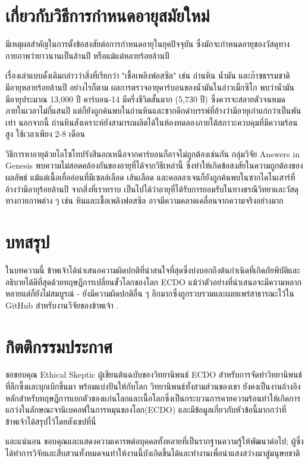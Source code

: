\documentclass[10pt,twocolumn,letterpaper]{article}
\begin{document}
\section{เกี่ยวกับวิธีการกำหนดอายุสมัยใหม่}

มีเหตุผลสำคัญในการตั้งข้อสงสัยต่อการกำหนดอายุในยุคปัจจุบัน ซึ่งมักจะกำหนดอายุของวัสดุทางกายภาพว่ายาวนานเป็นล้านปี หรือแม้แต่หลายร้อยล้านปี

เรื่องเล่าแบบดั้งเดิมกล่าวว่าสิ่งที่เรียกว่า "เชื้อเพลิงฟอสซิล" เช่น ถ่านหิน น้ำมัน และก๊าซธรรมชาติ มีอายุหลายร้อยล้านปี \cite{104} อย่างไรก็ตาม ผลการตรวจอายุคาร์บอนของน้ำมันในอ่าวเม็กซิโก พบว่าน้ำมันมีอายุประมาณ 13,000 ปี \cite{105} คาร์บอน-14 มีครึ่งชีวิตสั้นมาก (5,730 ปี) ซึ่งควรจะสลายตัวจนหมดภายในเวลาไม่กี่แสนปี แต่ก็ยังถูกค้นพบในถ่านหินและซากดึกดำบรรพ์ที่อ้างว่ามีอายุเก่าแก่กว่าเป็นพันเท่า \cite{106} นอกจากนี้ ถ่านหินสังเคราะห์ยังสามารถผลิตได้ในห้องทดลองภายใต้สภาวะควบคุมที่มีความร้อนสูง ใช้เวลาเพียง 2-8 เดือน \cite{107}

วิธีการหาอายุด้วยไอโซโทปรังสีนอกเหนือจากคาร์บอนก็อาจไม่ถูกต้องเช่นกัน กลุ่มวิจัย Answers in Genesis พบความไม่สอดคล้องกันของอายุที่ได้จากวิธีเหล่านี้ ซึ่งทำให้เกิดข้อสงสัยในความถูกต้องของผลลัพธ์ \cite{108} แม้แต่เนื้อเยื่ออ่อนที่มีเซลล์เลือด เส้นเลือด และคอลลาเจนก็ยังถูกค้นพบในซากไดโนเสาร์ที่อ้างว่ามีอายุร้อยล้านปี \cite{109,110} จากสิ่งที่เราทราบ เป็นไปได้ว่าอายุที่ได้รับการยอมรับในทางธรณีวิทยาและวัสดุทางกายภาพต่าง ๆ เช่น หินและเชื้อเพลิงฟอสซิล อาจมีความคลาดเคลื่อนจากความจริงอย่างมาก

\section{บทสรุป}

ในบทความนี้ ข้าพเจ้าได้นำเสนอความผิดปกติที่น่าสนใจที่สุดซึ่งบ่งบอกถึงต้นกำเนิดที่เกิดภัยพิบัติและอธิบายได้ดีที่สุดด้วยทฤษฎีการเปลี่ยนขั้วโลกของโลก ECDO แม้ว่าตัวอย่างที่นำเสนอจะมีความหลากหลายแต่ก็ยังไม่สมบูรณ์ - ยังมีความผิดปกติอื่น ๆ อีกมากซึ่งถูกรวบรวมและเผยแพร่สาธารณะไว้ใน GitHub สำหรับงานวิจัยของข้าพเจ้า \cite{2}.

\section{กิตติกรรมประกาศ}

ขอขอบคุณ Ethical Skeptic ผู้เขียนต้นฉบับของวิทยานิพนธ์ ECDO สำหรับการจัดทำวิทยานิพนธ์ที่ลึกซึ้งและบุกเบิกขึ้นมา พร้อมแบ่งปันให้กับโลก วิทยานิพนธ์ทั้งสามส่วนของเขา \cite{1} ยังคงเป็นงานอ้างอิงหลักสำหรับทฤษฎีการแยกตัวของแก่นโลกและเนื้อโลกซึ่งเป็นกระบวนการคายความร้อนทำให้เกิดการแกว่งในลักษณะจานิเบคอฟในการหมุนของโลก(ECDO) และมีข้อมูลเกี่ยวกับหัวข้อนี้มากกว่าที่ข้าพเจ้าได้สรุปไว้โดยสังเขปที่นี่

และแน่นอน ขอบคุณและแสดงความเคารพต่อบุคคลทั้งหลายที่เป็นรากฐานความรู้ให้พัฒนาต่อไป; ผู้ซึ่งได้ทำการวิจัยและสืบสวนทั้งหมดจนทำให้งานนี้บังเกิดขึ้นได้และทำงานเพื่อนำแสงสว่างมาสู่มนุษยชาติ

\clearpage
\twocolumn

{\small


}
\end{document}
